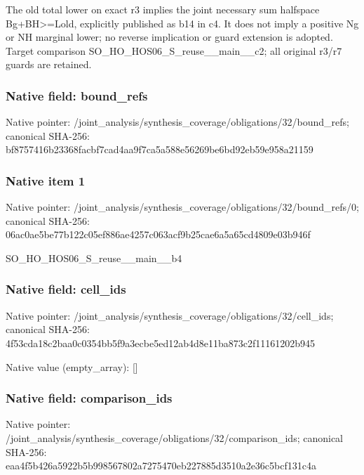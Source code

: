\documentclass[10pt,a4paper]{article}
\begin{document}
\begingroup\raggedright\sloppy The old total lower on exact r3 implies the joint necessary sum halfspace Bg+BH>=\allowbreak{}Lold,\allowbreak{} explicitly published as b14 in c4. It does not imply a positive Ng or NH marginal lower;\allowbreak{} no reverse implication or guard extension is adopted. Target comparison SO\_\allowbreak{}HO\_\allowbreak{}HOS06\_\allowbreak{}S\_\allowbreak{}reuse\_\allowbreak{}\_\allowbreak{}main\_\allowbreak{}\_\allowbreak{}c2;\allowbreak{} all original r3/\allowbreak{}r7 guards are retained.\par\endgroup

\subsubsection{Native field: bound\_\allowbreak{}refs}
Native pointer: /joint\_\allowbreak{}analysis/synthesis\_\allowbreak{}coverage/obligations/32/bound\_\allowbreak{}refs; canonical SHA-256: bf8757416b23368facbf7cad4aa9f7ca5a588e56269be6bd92eb59e958a21159

\subsubsection{Native item 1}
Native pointer: /joint\_\allowbreak{}analysis/synthesis\_\allowbreak{}coverage/obligations/32/bound\_\allowbreak{}refs/0; canonical SHA-256: 06ac0ae5be77b122c05ef886ae4257c063acf9b25cae6a5a65cd4809e03b946f

\begingroup\raggedright\sloppy SO\_\allowbreak{}HO\_\allowbreak{}HOS06\_\allowbreak{}S\_\allowbreak{}reuse\_\allowbreak{}\_\allowbreak{}main\_\allowbreak{}\_\allowbreak{}b4\par\endgroup

\subsubsection{Native field: cell\_\allowbreak{}ids}
Native pointer: /joint\_\allowbreak{}analysis/synthesis\_\allowbreak{}coverage/obligations/32/cell\_\allowbreak{}ids; canonical SHA-256: 4f53cda18c2baa0c0354bb5f9a3ecbe5ed12ab4d8e11ba873c2f11161202b945

Native value (empty\_\allowbreak{}array): []

\subsubsection{Native field: comparison\_\allowbreak{}ids}
Native pointer: /joint\_\allowbreak{}analysis/synthesis\_\allowbreak{}coverage/obligations/32/comparison\_\allowbreak{}ids; canonical SHA-256: eaa4f5b426a5922b5b998567802a7275470eb227885d3510a2e36c5bcf131c4a
\end{document}
